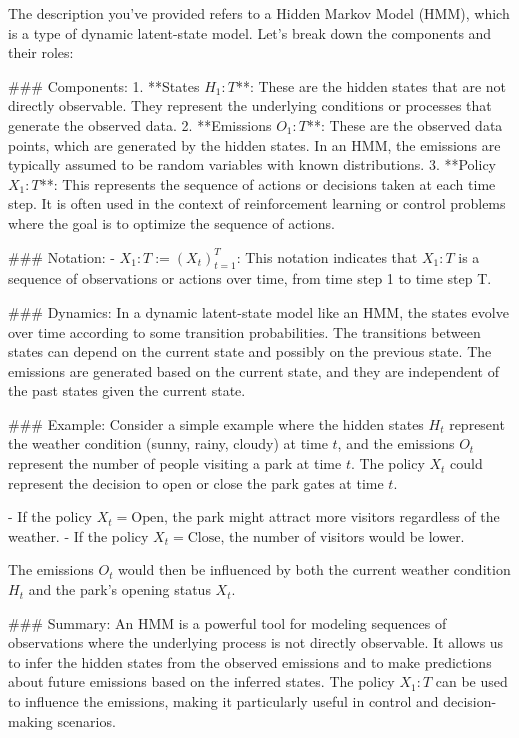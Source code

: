 The description you've provided refers to a Hidden Markov Model (HMM), which is a type of dynamic latent-state model. Let's break down the components and their roles:

### Components:
1. **States \( H_1:T \)**: These are the hidden states that are not directly observable. They represent the underlying conditions or processes that generate the observed data.
2. **Emissions \( O_1:T \)**: These are the observed data points, which are generated by the hidden states. In an HMM, the emissions are typically assumed to be random variables with known distributions.
3. **Policy \( X_1:T \)**: This represents the sequence of actions or decisions taken at each time step. It is often used in the context of reinforcement learning or control problems where the goal is to optimize the sequence of actions.

### Notation:
- \( X_1:T := (X_t)_{t=1}^T \): This notation indicates that \( X_1:T \) is a sequence of observations or actions over time, from time step 1 to time step T.

### Dynamics:
In a dynamic latent-state model like an HMM, the states evolve over time according to some transition probabilities. The transitions between states can depend on the current state and possibly on the previous state. The emissions are generated based on the current state, and they are independent of the past states given the current state.

### Example:
Consider a simple example where the hidden states \( H_t \) represent the weather condition (sunny, rainy, cloudy) at time \( t \), and the emissions \( O_t \) represent the number of people visiting a park at time \( t \). The policy \( X_t \) could represent the decision to open or close the park gates at time \( t \).

- If the policy \( X_t = \text{Open} \), the park might attract more visitors regardless of the weather.
- If the policy \( X_t = \text{Close} \), the number of visitors would be lower.

The emissions \( O_t \) would then be influenced by both the current weather condition \( H_t \) and the park's opening status \( X_t \).

### Summary:
An HMM is a powerful tool for modeling sequences of observations where the underlying process is not directly observable. It allows us to infer the hidden states from the observed emissions and to make predictions about future emissions based on the inferred states. The policy \( X_1:T \) can be used to influence the emissions, making it particularly useful in control and decision-making scenarios.